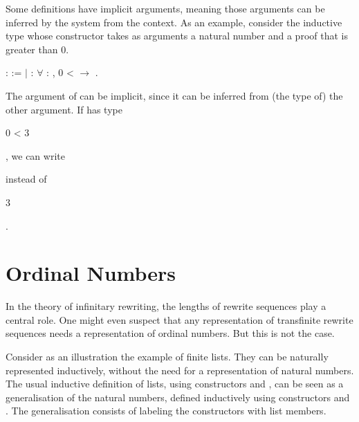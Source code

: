 Some definitions have implicit arguments, meaning those arguments can
be inferred by the system from the context. As an example, consider
the inductive type
 whose constructor
takes as arguments a natural number  and a proof that
 is greater than $0$.
\begin{singlespace}
\begin{coqdoccode}
\coqdocnoindent
{}
 :
 :=\coqdoceol
\coqdocindent{1.00em}
\ensuremath{|}  :
\ensuremath{\forall}  :
,
0 <  \ensuremath{\rightarrow}
.\coqdoceol
\end{coqdoccode}
\end{singlespace}
The argument  of
 can be implicit,
since it can be inferred from (the type of) the other argument. If
 has type \begin{coqdoccode}0 < 3\end{coqdoccode}, we can
write \begin{coqdoccode}
  \end{coqdoccode} instead
of \begin{coqdoccode} 3
  \end{coqdoccode}.



\section{Ordinal Numbers}\label{sec:ordimp}

In the theory of infinitary rewriting, the lengths of rewrite sequences play
a central role. One might even suspect that any representation of transfinite
rewrite sequences needs a representation of ordinal numbers. But this is not
the case.

Consider as an illustration the example of finite lists. They can be
naturally represented inductively, without the need for a
representation of natural numbers. The usual inductive definition of lists,
using constructors  and , can
be seen as a generalisation of the natural numbers, defined inductively using
constructors  and . The
generalisation consists of labeling the  constructors
with list members.

